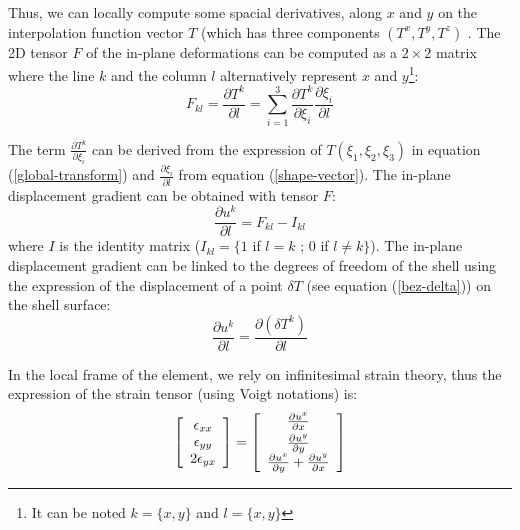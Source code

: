 \documentclass{egpubl}
\begin{document}
Thus, we can locally compute some spacial derivatives, along $x$ and $y$ on the interpolation function vector $T$ (which has three components $(T^x, T^y, T^z)$ .
The 2D tensor $F$ of the in-plane deformations can be computed as a $2\times2$ matrix where the line $k$ and the column $l$ alternatively represent $x$ and $y$\footnote{It can be noted $k=\{x,y\}$ and $l=\{x,y\}$}:
\begin{equation}
F_{kl} = \frac{\partial T^k}{\partial l}  =  \sum_{i=1}^3 \frac{\partial T^k}{\partial \xi_i} \frac{\partial \xi_i}{\partial l}  
\end{equation}

The term $\frac{\partial T^k}{\partial \xi_i}$ can be derived from the expression of $T(\xi_1,\xi_2, \xi_3)$ in equation (\ref{global-transform}) and 
$\frac{\partial \xi_i}{\partial l}$ from equation (\ref{shape-vector}). 
The in-plane displacement gradient can be obtained with tensor $F$:
\begin{equation}
\frac{\partial u^k}{\partial l} = F_{kl} - I_{kl} 
\end{equation}
where $I$ is the identity matrix ($I_{kl}  = \{1$ if $l=k$ ;  $0$ if $l \neq k \} $). 
The in-plane displacement gradient can be linked to the degrees of freedom of the shell using the expression of the displacement of a point $\delta T$ (see equation  (\ref{bez-delta})) on the shell surface:
$$
\frac{\partial u^k}{\partial l} = \frac{\partial (\delta T^k)}{\partial l}
$$

In the local frame of the element, we rely on infinitesimal strain theory, thus the expression of the strain tensor (using Voigt notations) is:
\begin{equation}
\label{in-plane-strain}
\left[ \begin{array}[c]{c} \epsilon_{xx} \\ \epsilon_{yy}  \\ 2\epsilon_{yx} \end{array} \right] = 
\left[ \begin{array}[c]{c} \frac{\partial u^x}{\partial x}  \vspace{1mm}\\ \frac{\partial u^y}{\partial y}   \\ \frac{\partial u^x}{\partial y}  + \frac{\partial u^y}{\partial x}  \end{array} \right]
\end{equation}
\end{document}
